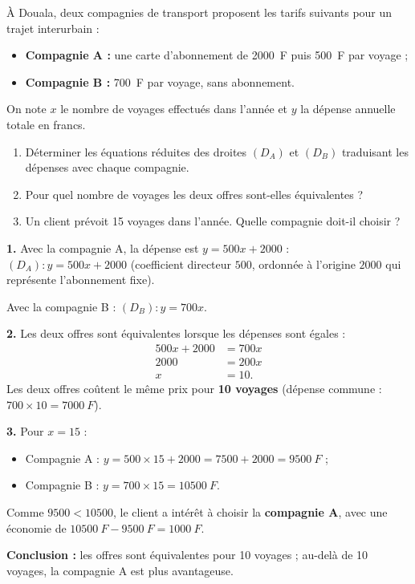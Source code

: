 \documentclass[11pt]{article}
\begin{document}
\begin{exoresolu}
À Douala, deux compagnies de transport proposent les tarifs suivants pour un trajet interurbain :
\begin{itemize}
\item \textbf{Compagnie A :} une carte d'abonnement de \SI{2000}{F} puis \SI{500}{F} par voyage ;
\item \textbf{Compagnie B :} \SI{700}{F} par voyage, sans abonnement.
\end{itemize}
On note $x$ le nombre de voyages effectués dans l'année et $y$ la dépense annuelle totale en francs.
\begin{enumerate}
\item Déterminer les équations réduites des droites $(D_A)$ et $(D_B)$ traduisant les dépenses avec chaque compagnie.
\item Pour quel nombre de voyages les deux offres sont-elles équivalentes ?
\item Un client prévoit 15 voyages dans l'année. Quelle compagnie doit-il choisir ?
\end{enumerate}
\tcblower
\textbf{1.} Avec la compagnie A, la dépense est $y = 500x + 2000$ : $(D_A) : y = 500x + 2000$ (coefficient directeur $500$, ordonnée à l'origine $2000$ qui représente l'abonnement fixe).

Avec la compagnie B : $(D_B) : y = 700x$.

\textbf{2.} Les deux offres sont équivalentes lorsque les dépenses sont égales :
\begin{align*}
500x + 2000 &= 700x \\
2000 &= 200x \\
x &= 10.
\end{align*}
Les deux offres coûtent le même prix pour \textbf{10 voyages} (dépense commune : $700 \times 10 = \SI{7000}{F}$).

\textbf{3.} Pour $x = 15$ :
\begin{itemize}
\item Compagnie A : $y = 500 \times 15 + 2000 = 7500 + 2000 = \SI{9500}{F}$ ;
\item Compagnie B : $y = 700 \times 15 = \SI{10500}{F}$.
\end{itemize}
Comme $9500 < 10500$, le client a intérêt à choisir la \textbf{compagnie A}, avec une économie de $\SI{10500}{F} - \SI{9500}{F} = \SI{1000}{F}$.

\textbf{Conclusion :} les offres sont équivalentes pour 10 voyages ; au-delà de 10 voyages, la compagnie A est plus avantageuse.
\end{exoresolu}
\end{document}
